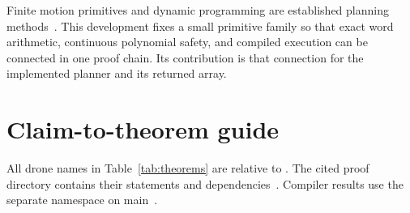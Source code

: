 \documentclass[11pt]{article}
\begin{document}
Finite motion primitives and dynamic programming are established planning methods~\cite{lavalle}.  This development fixes a small primitive family so that exact word arithmetic, continuous polynomial safety, and compiled execution can be connected in one proof chain.  Its contribution is that connection for the implemented planner and its returned array.

\appendix
\section{Claim-to-theorem guide}

All drone names in Table~\ref{tab:theorems} are relative to .  The cited proof directory contains their statements and dependencies~\cite{drone-proofs}.  Compiler results use the separate  namespace on main~\cite{compiler-source}.
\end{document}
